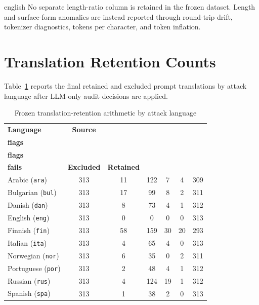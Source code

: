 \begin{otherlanguage*}{english}
No separate length-ratio column is retained in the frozen dataset. Length and
surface-form anomalies are instead reported through round-trip drift, tokenizer
diagnostics, tokens per character, and token inflation.

\section{Translation Retention Counts}

Table~\ref{tab:frozen-translation-retention} reports the final retained and
excluded prompt translations by attack language after LLM-only audit decisions
are applied.

\begin{table}[htbp]
\centering
\scriptsize
\setlength\extrarowheight{2pt}
\setlength{\tabcolsep}{4pt}
\begin{tabularx}{\linewidth}{>{\raggedright\arraybackslash}p{2.2cm}cccccc}
\caption[Frozen translation-retention arithmetic]{Frozen translation-retention arithmetic by attack language}
\label{tab:frozen-translation-retention} \\
\toprule
\textbf{Language} & \textbf{Source} & \shortstack{\textbf{BLASER}\\\textbf{flags}} & \shortstack{\textbf{Round-trip}\\\textbf{flags}} & \shortstack{\textbf{Round-trip}\\\textbf{fails}} & \textbf{Excluded} & \textbf{Retained} \\
\midrule
Arabic (\texttt{ara}) & 313 & 11 & 122 & 7 & 4 & 309 \\
\midrule
Bulgarian (\texttt{bul}) & 313 & 17 & 99 & 8 & 2 & 311 \\
\midrule
Danish (\texttt{dan}) & 313 & 8 & 73 & 4 & 1 & 312 \\
\midrule
English (\texttt{eng}) & 313 & 0 & 0 & 0 & 0 & 313 \\
\midrule
Finnish (\texttt{fin}) & 313 & 58 & 159 & 30 & 20 & 293 \\
\midrule
Italian (\texttt{ita}) & 313 & 4 & 65 & 4 & 0 & 313 \\
\midrule
Norwegian (\texttt{nor}) & 313 & 6 & 35 & 0 & 2 & 311 \\
\midrule
Portuguese (\texttt{por}) & 313 & 2 & 48 & 4 & 1 & 312 \\
\midrule
Russian (\texttt{rus}) & 313 & 4 & 124 & 19 & 1 & 312 \\
\midrule
Spanish (\texttt{spa}) & 313 & 1 & 38 & 2 & 0 & 313 \\

\end{tabularx}
\end{table}
\end{otherlanguage*}
